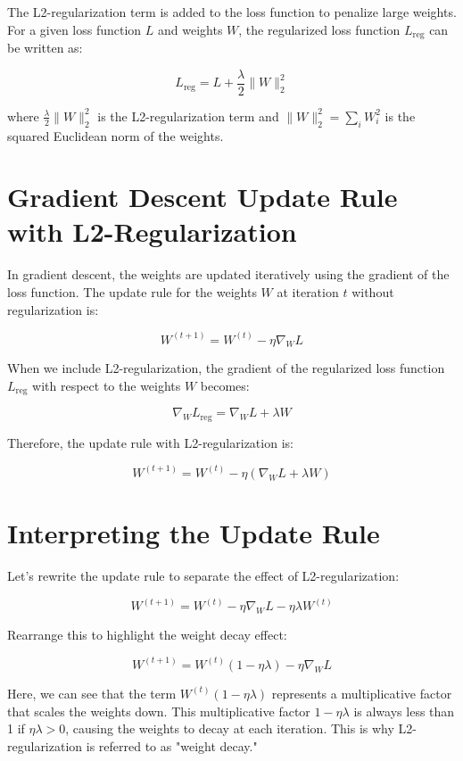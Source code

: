 \documentclass{article}
\begin{document}
The L2-regularization term is added to the loss function to penalize large weights. For a given loss function \( L \) and weights \( W \), the regularized loss function \( L_{\text{reg}} \) can be written as:

\[
L_{\text{reg}} = L + \frac{\lambda}{2} \|W\|_2^2
\]

where \( \frac{\lambda}{2} \|W\|_2^2 \) is the L2-regularization term and \( \|W\|_2^2 = \sum_{i} W_i^2 \) is the squared Euclidean norm of the weights.

\section*{Gradient Descent Update Rule with L2-Regularization}

In gradient descent, the weights are updated iteratively using the gradient of the loss function. The update rule for the weights \( W \) at iteration \( t \) without regularization is:

\[
W^{(t+1)} = W^{(t)} - \eta \nabla_W L
\]

When we include L2-regularization, the gradient of the regularized loss function \( L_{\text{reg}} \) with respect to the weights \( W \) becomes:

\[
\nabla_W L_{\text{reg}} = \nabla_W L + \lambda W
\]

Therefore, the update rule with L2-regularization is:

\[
W^{(t+1)} = W^{(t)} - \eta \left( \nabla_W L + \lambda W \right)
\]

\section*{Interpreting the Update Rule}

Let's rewrite the update rule to separate the effect of L2-regularization:

\[
W^{(t+1)} = W^{(t)} - \eta \nabla_W L - \eta \lambda W^{(t)}
\]

Rearrange this to highlight the weight decay effect:

\[
W^{(t+1)} = W^{(t)} \left( 1 - \eta \lambda \right) - \eta \nabla_W L
\]

Here, we can see that the term \( W^{(t)} \left( 1 - \eta \lambda \right) \) represents a multiplicative factor that scales the weights down. This multiplicative factor \( 1 - \eta \lambda \) is always less than 1 if \( \eta \lambda > 0 \), causing the weights to decay at each iteration. This is why L2-regularization is referred to as "weight decay."
\end{document}
